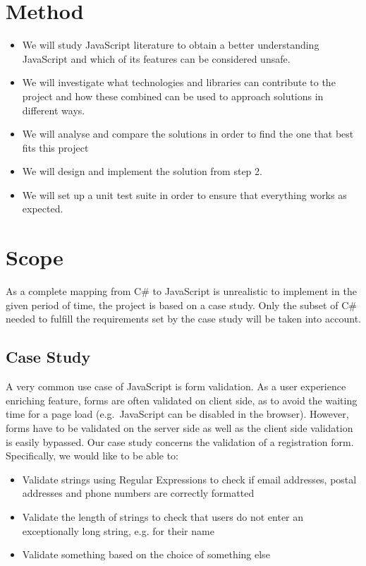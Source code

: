 \section{Method}
	\begin{itemize}
	\item We will study JavaScript literature to obtain a better understanding JavaScript and which of its features can be considered unsafe. 
	\item We will investigate what technologies and libraries can contribute to the project and how these combined can be used to approach solutions in different ways.
	\item We will analyse and compare the solutions in order to find the one that best fits this project
	\item We will design and implement the solution from step 2.
	\item We will set up a unit test suite in order to ensure that everything works as expected.
	\end{itemize}

\section{Scope}
	As a complete mapping from C\# to JavaScript is unrealistic to implement in the given period of time, the project is based on a case study. Only the subset of C\# needed to fulfill the requirements set by the case study will be taken into account.

	\subsection{Case Study}
		A very common use case of JavaScript is form validation. As a user experience enriching feature, forms are often validated on client side, as to avoid the waiting time for a page load (e.g.\ JavaScript can be disabled in the browser). However, forms have to be validated on the server side as well as the client side validation is easily bypassed. Our case study concerns the validation of a registration form. Specifically, we would like to be able to:

		\begin{itemize}
			\item Validate strings using Regular Expressions to check if email addresses, postal addresses and phone numbers are correctly formatted
			\item Validate the length of strings to check that users do not enter an exceptionally long string, e.g. for their name
			\item Validate something based on the choice of something else
		\end{itemize}

